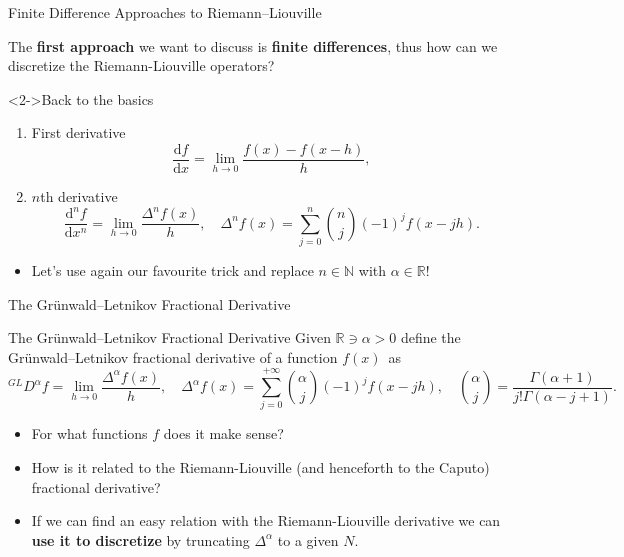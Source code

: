 \documentclass[aspectratio=169,xcolor=dvipsnames]{beamer}
\begin{document}
\begin{frame}{Finite Difference Approaches to Riemann--Liouville}
	
The \textbf{first approach} we want to discuss is \alert{\textbf{finite differences}}, thus how can we discretize the Riemann-Liouville operators?

\begin{alertblock}<2->{Back to the basics}
\begin{enumerate}
	\item<2-> First derivative
	\[
	\frac{\mathrm{d} f}{\mathrm{d}x} = \lim_{h \rightarrow 0} \frac{f(x)-f(x-h)}{h},
	\]
	\item<3-> $n$th derivative
	\[
	\frac{\mathrm{d}^n f}{\mathrm{d}x^n} = \lim_{h \rightarrow 0} \frac{\Delta^n f(x)}{h}, \quad \Delta^n f(x) = \sum_{j=0}^{n}\binom{n}{j}(-1)^j f(x-jh).
	\]
\end{enumerate}
\end{alertblock}

\begin{itemize}
	\item[\faLightbulb]<4-> Let's use again our favourite trick and replace $n \in \mathbb{N}$ with $\alpha \in \mathbb{R}$!
\end{itemize}

\end{frame}

\begin{frame}{The Gr\"unwald--Letnikov Fractional Derivative}

\begin{exampleblock}{The Gr\"unwald--Letnikov Fractional Derivative \parencite{grunwald1867uber,letnikov1868theory}}
Given $\mathbb{R} \ni \alpha > 0$ define the Gr\"unwald--Letnikov fractional derivative of a function $f(x)$~as
\[
{}^{GL}D^\alpha f = \lim_{h \rightarrow 0} \frac{\Delta^\alpha f(x)}{h}, \quad \Delta^\alpha f(x) = \sum_{j=0}^{+\infty}\binom{\alpha}{j}(-1)^j f(x-jh), \quad \binom{\alpha}{j} = \frac{\Gamma(\alpha+1)}{j! \Gamma(\alpha-j+1)}.
\]
\end{exampleblock}

\begin{itemize}
	\item[\faQuestionCircle]<2-> For what functions $f$ does it make sense?
	\item[\faQuestionCircle]<3-> How is it related to the Riemann-Liouville (and henceforth to the Caputo) fractional derivative?
	\item[\faLightbulb]<4-> If we can find an easy relation with the Riemann-Liouville derivative we can \textbf{use it to discretize} by truncating $\Delta^\alpha$ to a given $N$.
\end{itemize}

\end{frame}
\end{document}
